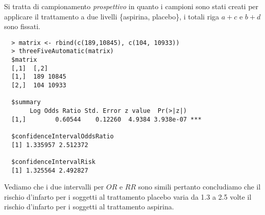 Si tratta di campionamento \emph{prospettivo} in quanto i campioni
sono stati creati per applicare il trattamento a due livelli
\{aspirina, placebo\}, i totali riga $a + c$ e $b + d$ sono fissati.
\begin{lstlisting}
  > matrix <- rbind(c(189,10845), c(104, 10933))
  > threeFiveAutomatic(matrix)
  $matrix
  [,1]  [,2]
  [1,]  189 10845
  [2,]  104 10933

  $summary
       Log Odds Ratio Std. Error z value  Pr(>|z|)    
  [1,]        0.60544    0.12260  4.9384 3.938e-07 ***

  $confidenceIntervalOddsRatio
  [1] 1.335957 2.512372

  $confidenceIntervalRisk
  [1] 1.325564 2.492827
\end{lstlisting}
Vediamo che i due intervalli per $OR$ e $RR$ sono simili pertanto
concludiamo che il rischio d'infarto per i soggetti al trattamento
placebo varia da 1.3 a 2.5 volte il rischio d'infarto per i soggetti
al trattamento aspirina.

